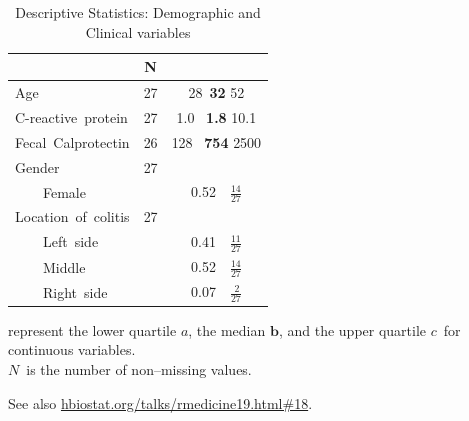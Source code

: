 \begin{table}[!h]
 \caption{Descriptive Statistics: Demographic and Clinical variables\label{summ1}}
 \begin{center}
 \begin{tabular}{lrc}\hline\hline
\multicolumn{1}{l}{}&
\multicolumn{1}{c}{N}&
\multicolumn{1}{c}{ }
\\ \hline
Age&27&{\scriptsize 28~}{\textbf{32} }{\scriptsize 52} \\
C-reactive~protein&27&{\scriptsize  1.0~}{ \textbf{1.8} }{\scriptsize 10.1} \\
Fecal~Calprotectin &26&{\scriptsize  128~}{ \textbf{754} }{\scriptsize 2500} \\
Gender&27&\\
~~~~Female&&0.52~{\scriptsize~$\frac{14}{27}$}\\
Location~of~colitis&27&\\
~~~~Left~side&&0.41~{\scriptsize~$\frac{11}{27}$}\\
~~~~Middle&&0.52~{\scriptsize~$\frac{14}{27}$}\\
~~~~Right~side&&0.07~{\scriptsize~$\frac{~2}{27}$}\\
\hline
\end{tabular}

\end{center}

 represent the lower quartile $a$, the median $\mathbf{b}$, and the upper quartile $c$\ for continuous variables.\\
$N$\ is the number of non--missing values.\\

\end{table}

See also \href{https://hbiostat.org/talks/rmedicine19.html#18}{hbiostat.org/talks/rmedicine19.html\#18}.
